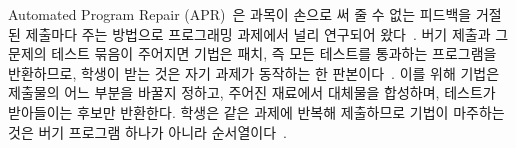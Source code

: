 \documentclass[10pt,conference]{IEEEtran}
\begin{document}
Automated Program Repair (APR)~\cite{gazzola2019automatic,monperrus2018automatic,weimer2009automatically,legoues2012genprog}은 과목이 손으로 써 줄 수 없는 피드백을 거절된 제출마다 주는 방법으로 프로그래밍 과제에서 널리 연구되어 왔다~\cite{keuning2018systematic}. 버기 제출과 그 문제의 테스트 묶음이 주어지면 기법은 패치, 즉 모든 테스트를 통과하는 프로그램을 반환하므로, 학생이 받는 것은 자기 과제가 동작하는 한 판본이다~\cite{joshi2023repair,zhang2024pydex}. 이를 위해 기법은 제출물의 어느 부분을 바꿀지 정하고, 주어진 재료에서 대체물을 합성하며, 테스트가 받아들이는 후보만 반환한다. 학생은 같은 과제에 반복해 제출하므로 기법이 마주하는 것은 버기 프로그램 하나가 아니라 순서열이다~\cite{duan2024tiktoc}.
\end{document}

